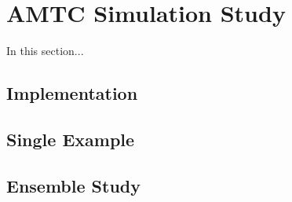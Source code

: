 \section{AMTC Simulation Study}

In this section...

\subsection{Implementation}


\subsection{Single Example}


\subsection{Ensemble Study}


